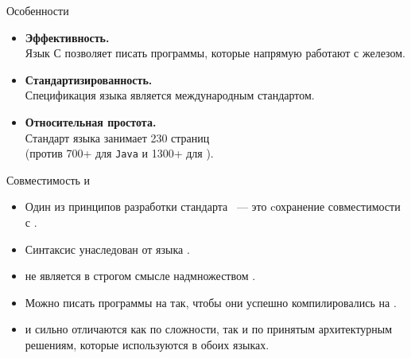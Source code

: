 \documentclass[aspectration=1610,t]{beamer}
\begin{document}
\begin{frame}{Особенности \langc}
    \begin{itemize}
        \item {\bf Эффективность.}\\
            Язык С позволяет писать программы, которые напрямую работают с железом. 
        \item {\bf Стандартизированность.}\\
            Спецификация языка \langc является международным стандартом.
        \item {\bf Относительная простота.}\\
            Стандарт языка \langc занимает 230 страниц\\
            (против 700+ для \texttt{Java} и 1300+ для \langcpp).
    \end{itemize}
\end{frame}

\begin{frame}{Совместимость \langc и \langcpp}

    \begin{itemize}
        \item Один из принципов разработки стандарта \langcpp~— это
            cохранение совместимости с \langc. 
        \item Синтаксис \langcpp унаследован от языка \langc. 
        \item \langcpp не является в строгом смысле надмножеством \langc.
        \item Можно писать программы на \langc так, чтобы они успешно
            компилировались на \langcpp.
        \item \langc и \langcpp сильно отличаются как по сложности, так и по принятым 
            архитектурным решениям, которые используются в обоих языках.
    \end{itemize}
\end{frame}
\end{document}
